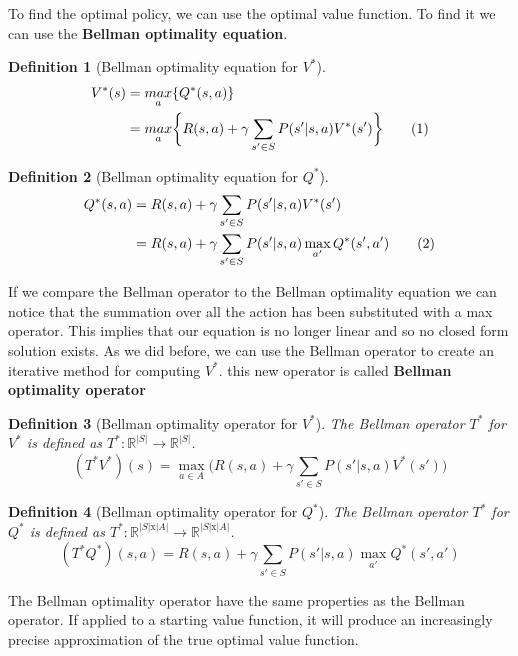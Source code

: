 \documentclass[main.tex]{subfiles}
\newcommand\numberthis{\addtocounter{equation}{1}\tag{\theequation}}
\newtheorem{definition}{Definition}[section]
\begin{document}
To find the optimal policy, we can use the optimal value function. To find it we can use the \textbf{Bellman optimality equation}.
\begin{definition}[Bellman optimality equation for $V^*$]
    \begin{align*}
        V^*(s) & = \underset{a}{max} \{ Q^*(s,a) \}                                                               \\
               & = \underset{a}{max} \bigg\{ R(s,a) + \gamma \sum_{s' \in S} P(s'|s,a)V^*(s') \bigg\} \numberthis
    \end{align*}
\end{definition}

\begin{definition}[Bellman optimality equation for $Q^*$]
    \begin{align*}
        Q^*(s,a) & = R(s,a) + \gamma \sum_{s' \in S} P(s'|s,a)V^*(s')                           \\
                 & = R(s,a) + \gamma \sum_{s' \in S} P(s'|s,a) \max_{a'} Q^*(s',a') \numberthis
    \end{align*}
\end{definition}
If we compare the Bellman operator to the Bellman optimality equation we can notice that the summation over all the action has been substituted with a max operator. This implies that our equation is no longer linear and so no closed form solution exists. As we did before, we can use the Bellman operator to create an iterative method for computing $V^*$. this new operator is called \textbf{Bellman optimality operator}
\begin{definition}[Bellman optimality operator for $V^*$]
    The Bellman operator $T^*$ for $V^*$ is defined as $T^*:\mathbb{R}^{|S|} \rightarrow \mathbb{R}^{|S|}$\footnotemark.
    \begin{equation}
        (T^*V^*)(s) = \max_{a \in A} \bigg( R(s,a) + \gamma \sum_{s' \in S} P(s'|s,a) V^*(s') \bigg)
    \end{equation}
\end{definition}

\begin{definition}[Bellman optimality operator for $Q^*$]
    The Bellman operator $T^*$ for $Q^*$ is defined as $T^*:\mathbb{R}^{|S|\text{x}|A|} \rightarrow \mathbb{R}^{|S|\text{x}|A|}$.
    \begin{equation}
        (T^*Q^*)(s,a) =  R(s,a) + \gamma \sum_{s' \in S} P(s'|s,a) \max_{a'} Q^*(s',a')
    \end{equation}
\end{definition}
The Bellman optimality operator have the same properties as the Bellman operator. If applied to a starting value function, it will produce an increasingly precise approximation of the true optimal value function.
\end{document}
